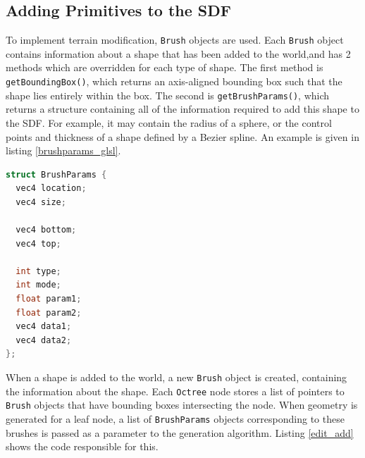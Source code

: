\documentclass{article}
\begin{document}
\subsection{Adding Primitives to the SDF}
\label{section:modification_implementation}
To implement terrain modification, \texttt{Brush} objects are used. Each \texttt{Brush} object contains information about a shape that has been added to the world,and has 2 methods which are overridden for each type of shape. The first method is \texttt{getBoundingBox()}, which returns an axis-aligned bounding box such that the shape lies entirely within the box. The second is \texttt{getBrushParams()}, which returns a structure containing all of the information required to add this shape to the SDF. For example, it may contain the radius of a sphere, or the control points and thickness of a shape defined by a Bezier spline. An example is given in listing \ref{brushparams_glsl}.
\begin{lstlisting}[language=C++,label={brushparams_glsl},caption={The \texttt{BrushParams} data structure, in GLSL. Common to all shapes are the values \texttt{bottom} and \texttt{top}, which correspond to diagonally opposite corners of the bounding box as given in \texttt{getBoundingBox}, the value \texttt{type}, which is a constant corresponding to the type of shape represented, and \texttt{mode}, which is a constant describing how the shape is to be added to the SDF, for example whether it should be added or subtracted. In principle, the other values may be used however they are needed, but typically the \texttt{location} and \texttt{size} variables represent the location and size of the shape to be added.}]
struct BrushParams {
  vec4 location;
  vec4 size;

  vec4 bottom;
  vec4 top;

  int type;
  int mode;
  float param1;
  float param2;
  vec4 data1;
  vec4 data2;
};
\end{lstlisting}
When a shape is added to the world, a new \texttt{Brush} object is created, containing the information about the shape. Each \texttt{Octree} node stores a list of pointers to \texttt{Brush} objects that have bounding boxes intersecting the node. When geometry is generated for a leaf node, a list of \texttt{BrushParams} objects corresponding to these brushes is passed as a parameter to the generation algorithm. Listing \ref{edit_add} shows the code responsible for this.
\end{document}
